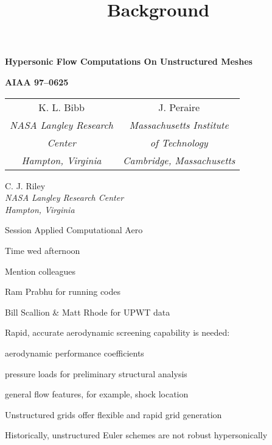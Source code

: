 \documentclass[landscape]{slides}
\begin{document}
\begin{slide}
  \begin{center}
    {\Large\bf Hypersonic Flow Computations On Unstructured Meshes}

    {\large\bf AIAA 97--0625}

    \begin{tabular}{cc}
      K. L. Bibb                & J. Peraire               \\[.1in]
      \it NASA Langley Research & \it Massachusetts Institute  \\
      \it Center                & \it of Technology           \\
      \it Hampton, Virginia     & \it Cambridge, Massachusetts
    \end{tabular}

    C. J. Riley \\[.1in]
    \it NASA Langley Research Center \\
        Hampton, Virginia
  \end{center}
\end{slide}

\begin{note}
  \begin{describe}[1.5in]
    \item [Session] Applied Computational Aero
    \item [Time] wed afternoon
    \item [Mention] colleagues
          \begin{items} 
             \item Ram Prabhu for running codes
             \item Bill Scallion \& Matt Rhode for UPWT data
          \end{items}
  \end{describe}
\end{note}

\begin{slide}
  \title{Background}
  \begin{items}
    \item Rapid, accurate aerodynamic screening capability is
          needed:
          \begin{items}
            \item aerodynamic performance coefficients
            \item pressure loads for preliminary structural analysis
            \item general flow features, for example, shock location
          \end{items}
    \item Unstructured grids offer flexible and rapid grid generation
    \item Historically, unstructured Euler schemes
          are not robust hypersonically
  \end{items}
\end{slide}
\end{document}
